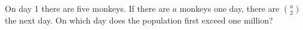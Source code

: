 On day 1 there are five monkeys. If there are $a$ monkeys one day, there are $\binom a2$ the next day. On which day does the population first exceed one million?

